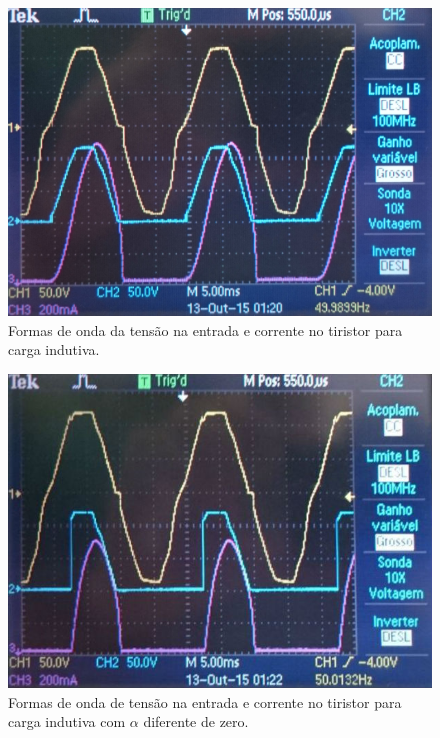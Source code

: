 \documentclass[a4paper,11pt]{article}
\numberwithin{equation}{section}
\begin{document}
\begin{figure}[H]
	\centering
	\includegraphics[keepaspectratio=true, scale=0.11]{img/figs/tiristor_alfa_zero}
	\caption{Formas de onda da tensão na entrada e corrente no tiristor para carga indutiva.}
	\label{fig:tiristor_alfa_zero}
	\vspace{-0.8em}
\end{figure}

\begin{figure}[H]
	\centering
	\includegraphics[keepaspectratio=true, scale=0.43]{img/figs/tiristor_alfa_dif_zero}
	\caption{Formas de onda de tensão na entrada e corrente no tiristor para carga indutiva com $\alpha$ diferente de zero.}
	\label{fig:tiristor_alfa_dif_zero}
	\vspace{-0.8em}
\end{figure}
\end{document}
